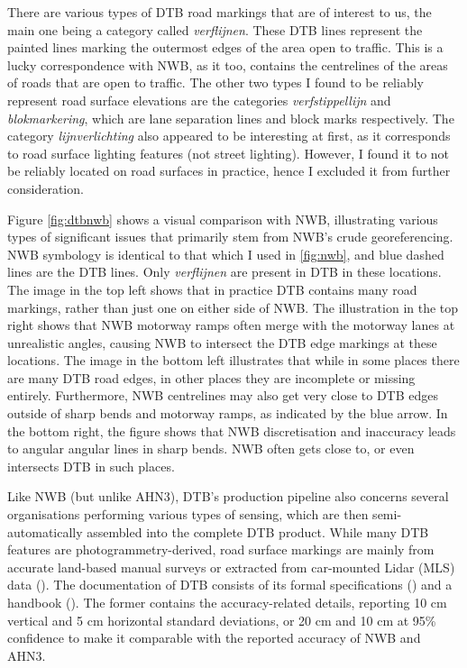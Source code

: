 There are various types of DTB road markings that are of interest to us, the main one being a category called \textit{verflijnen}. These DTB lines represent the painted lines marking the outermost edges of the area open to traffic. This is a lucky correspondence with NWB, as it too, contains the centrelines of the areas of roads that are open to traffic. The other two types I found to be reliably represent road surface elevations are the categories \textit{verfstippellijn} and \textit{blokmarkering}, which are lane separation lines and block marks respectively. The category \textit{lijnverlichting} also appeared to be interesting at first, as it corresponds to road surface lighting features (not street lighting). However, I found it to not be reliably located on road surfaces in practice, hence I excluded it from further consideration.

Figure \ref{fig:dtbnwb} shows a visual comparison with NWB, illustrating various types of significant issues that primarily stem from NWB's crude georeferencing. NWB symbology is identical to that which I used in \ref{fig:nwb}, and blue dashed lines are the DTB lines. Only \textit{verflijnen} are present in DTB in these locations. The image in the top left shows that in practice DTB contains many road markings, rather than just one on either side of NWB. The illustration in the top right shows that NWB motorway ramps often merge with the motorway lanes at unrealistic angles, causing NWB to intersect the DTB edge markings at these locations. The image in the bottom left illustrates that while in some places there are many DTB road edges, in other places they are incomplete or missing entirely. Furthermore, NWB centrelines may also get very close to DTB edges outside of sharp bends and motorway ramps, as indicated by the blue arrow. In the bottom right, the figure shows that NWB discretisation and inaccuracy leads to angular angular lines in sharp bends. NWB often gets close to, or even intersects DTB in such places.

Like NWB (but unlike AHN3), DTB’s production pipeline also concerns several organisations performing various types of sensing, which are then semi-automatically assembled into the complete DTB product. While many DTB features are photogrammetry-derived, road surface markings are mainly from accurate land-based manual surveys or extracted from car-mounted Lidar (MLS) data (\cite{oudeElberink_vosselman_2012}). The documentation of DTB consists of its formal specifications (\cite{dtb_docs}) and a handbook (\cite{dtb_handbook}). The former contains the accuracy-related details, reporting 10 cm vertical and 5 cm horizontal standard deviations, or 20 cm and 10 cm at 95\% confidence to make it comparable with the reported accuracy of NWB and AHN3.

